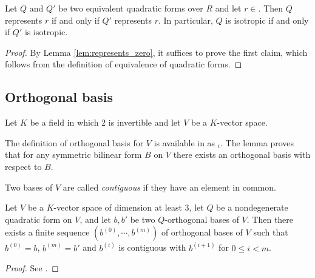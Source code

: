 \begin{lemma}\label{lem:represents_iff}
\leanok
{}
Let $Q$ and $Q'$ be two equivalent quadratic forms over $R$ and let $r \in $. Then $Q$ represents $r$ if and only if $Q'$ represents $r$. In particular, $Q$ is isotropic if and only if $Q'$ is isotropic.

\end{lemma}

\begin{proof}
By Lemma \ref{lem:represents_zero}, it suffices to prove the first claim, which follows from the definition of equivalence of quadratic forms.
\end{proof}
\subsection{Orthogonal basis}\label{subsec:ortho_basis}

Let $K$ be a field in which $2$ is invertible and let $V$ be a $K$-vector space.

The definition of orthogonal basis for $V$ is available in \mathlib as $_i$. The lemma  proves that for any symmetric bilinear form $B$ on $V$ there exists an orthogonal basis with respect to $B$.

\begin{definition}\label{def:contiguous}
\leanok
Two bases of $V$ are called \emph{contiguous} if they have an element in common.
\end{definition}

\begin{theorem}\label{thm:exists_chain}
\leanok
Let $V$ be a $K$-vector space of dimension at least $3$, let $Q$ be a nondegenerate quadratic form on $V$, and let $b, b'$ be two $Q$-orthogonal bases of $V$. Then there exists a finite sequence $(b^{(0)}, \cdots, b^{(m)})$ of orthogonal bases of $V$ such that $b^{(0)} = b$, $b^{(m)} = b'$ and $b^{(i)}$ is contiguous with $b^{(i + 1)}$ for $0 \le i < m$.
\end{theorem}

\begin{proof}
See \cite[\S IV.1.4, Theorem 2]{Ser73}.
\end{proof}

